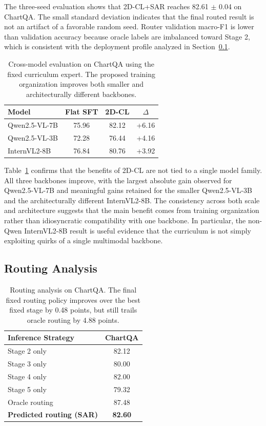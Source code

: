 \documentclass[journal]{IEEEtran}
\newcommand{\method}{2D-CL}
\newcommand{\sar}{SAR}
\begin{document}
The three-seed evaluation shows that \method{}+\sar{} reaches 82.61 $\pm$ 0.04 on ChartQA.
The small standard deviation indicates that the final routed result is not an artifact of a favorable random seed.
Router validation macro-F1 is lower than validation accuracy because oracle labels are imbalanced toward Stage 2, which is consistent with the deployment profile analyzed in Section~\ref{sec:routing_analysis}.

\begin{table}[!t]
\centering
\small
\begin{tabular}{lccc}
\toprule
\textbf{Model} & \textbf{Flat SFT} & \textbf{2D-CL} & \textbf{$\Delta$} \\
\midrule
Qwen2.5-VL-7B & 75.96 & 82.12 & +6.16 \\
Qwen2.5-VL-3B & 72.28 & 76.44 & +4.16 \\
InternVL2-8B & 76.84 & 80.76 & +3.92 \\
\bottomrule
\end{tabular}
\vspace{4pt}
\caption{Cross-model evaluation on ChartQA using the fixed curriculum expert. The proposed training organization improves both smaller and architecturally different backbones.}
\label{tab:models}
\end{table}

Table~\ref{tab:models} confirms that the benefits of \method{} are not tied to a single model family.
All three backbones improve, with the largest absolute gain observed for Qwen2.5-VL-7B and meaningful gains retained for the smaller Qwen2.5-VL-3B and the architecturally different InternVL2-8B.
The consistency across both scale and architecture suggests that the main benefit comes from training organization rather than idiosyncratic compatibility with one backbone.
In particular, the non-Qwen InternVL2-8B result is useful evidence that the curriculum is not simply exploiting quirks of a single multimodal backbone.

\subsection{Routing Analysis}
\label{sec:routing_analysis}
\begin{table}[!t]
\centering
\small
\begin{tabular}{lc}
\toprule
\textbf{Inference Strategy} & \textbf{ChartQA} \\
\midrule
Stage 2 only & 82.12 \\
Stage 3 only & 80.00 \\
Stage 4 only & 82.00 \\
Stage 5 only & 79.32 \\
Oracle routing & 87.48 \\
\textbf{Predicted routing (\sar{})} & \textbf{82.60} \\
\bottomrule
\end{tabular}
\vspace{4pt}
\caption{Routing analysis on ChartQA. The final fixed routing policy improves over the best fixed stage by 0.48 points, but still trails oracle routing by 4.88 points.}
\label{tab:routing}
\end{table}
\end{document}
